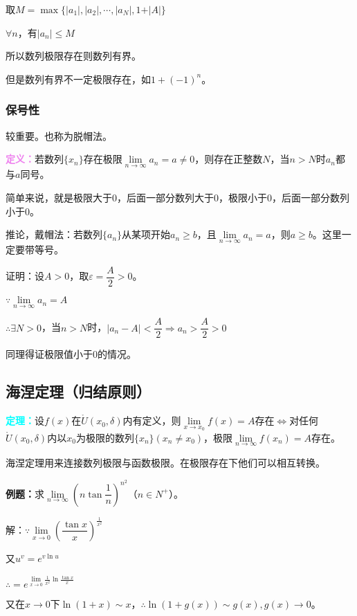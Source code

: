 \documentclass[UTF8, 12pt]{ctexart}
\begin{document}
取$M=\max\{\vert a_1\vert,\vert a_2\vert,\cdots,\vert a_N\vert,1+\vert A\vert\}$

$\forall n$，有$\vert a_n\vert\leqslant M$

所以数列极限存在则数列有界。

但是数列有界不一定极限存在，如$1+(-1)^n$。

\subsubsection{保号性}

较重要。也称为脱帽法。

\textcolor{violet}{\textbf{定义：}}若数列$\{x_n\}$存在极限$\lim\limits_{n\to\infty}a_n=a\neq 0$，则存在正整数$N$，当$n>N$时$a_n$都与$a$同号。

简单来说，就是极限大于0，后面一部分数列大于0，极限小于0，后面一部分数列小于0。

推论，戴帽法：若数列$\{a_n\}$从某项开始$a_n\geqslant b$，且$\lim\limits_{n\to\infty}a_n=a$，则$a\geqslant b$。这里一定要带等号。

证明：设$A>0$，取$\varepsilon=\dfrac{A}{2}>0$。

$\because\lim\limits_{n\to\infty}a_n=A$

$\therefore\exists N>0$，当$n>N$时，$\vert a_n-A\vert<\dfrac{A}{2}\Rightarrow a_n>\dfrac{A}{2}>0$

同理得证极限值小于0的情况。

\subsection{海涅定理（归结原则）}

\textcolor{aqua}{\textbf{定理：}}设$f(x)$在$\mathring{U}(x_0,\delta)$内有定义，则$\lim\limits_{x\to x_0}f(x)=A$存在$\Leftrightarrow$对任何$\mathring{U}(x_0,\delta)$内以$x_0$为极限的数列$\{x_n\}(x_n\neq x_0)$，极限$\lim\limits_{n\to\infty}f(x_n)=A$存在。

海涅定理用来连接数列极限与函数极限。在极限存在下他们可以相互转换。

\textbf{例题：}求$\lim\limits_{n\to\infty}\left(n\tan\dfrac{1}{n}\right)^{n^2}$（$n\in N^+$）。

解：$\because \lim\limits_{x\to 0}\left(\dfrac{\tan x}{x}\right)^{\frac{1}{x^2}}$

又$u^v=e^{v\ln u}$

$\therefore =e^{\lim\limits_{x\to 0}\frac{1}{x^2}\ln\frac{\tan x}{x}}$

又在$x\to 0$下$\ln (1+x)\sim x$，$\therefore \ln(1+g(x))\sim g(x),g(x)\to 0$。
\end{document}
